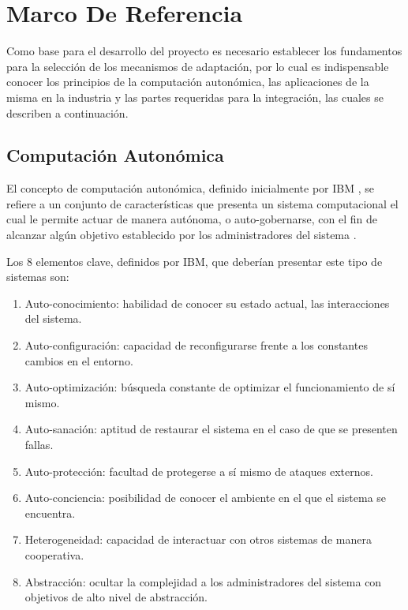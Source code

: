 \documentclass[12pt]{article}
\begin{document}
    \section{Marco De Referencia}

    Como base para el desarrollo del proyecto es necesario establecer los fundamentos para la selección de los mecanismos de adaptación, por lo cual es indispensable conocer los principios de la computación autonómica, las aplicaciones de la misma en la industria y las partes requeridas para la integración, las cuales se describen a continuación.

    \subsection{Computación Autonómica}
    

    El concepto de computación autonómica, definido inicialmente por IBM \citeyear{horn_2001}, se refiere a un conjunto de características que presenta un sistema computacional el cual le permite actuar de manera autónoma, o auto-gobernarse, con el fin de alcanzar algún objetivo establecido por los administradores del sistema \cite{lalanda_diaconescu_mccann_2014}.


    Los 8 elementos clave, definidos por IBM, que deberían presentar este tipo de sistemas son:
    \begin{enumerate}
        \item Auto-conocimiento: habilidad de conocer su estado actual, las interacciones del sistema.
        \item Auto-configuración: capacidad de reconfigurarse frente a los constantes cambios en el entorno.
        \item Auto-optimización: búsqueda constante de optimizar el funcionamiento de sí mismo.
        \item Auto-sanación: aptitud de restaurar el sistema en el caso de que se presenten fallas.
        \item Auto-protección: facultad de protegerse a sí mismo de ataques externos.
        \item Auto-conciencia: posibilidad de conocer el ambiente en el que el sistema se encuentra.
        \item Heterogeneidad: capacidad de interactuar con otros sistemas de manera cooperativa.
        \item Abstracción: ocultar la complejidad a los administradores del sistema con objetivos de alto nivel de abstracción.
    \end{enumerate}
\end{document}
